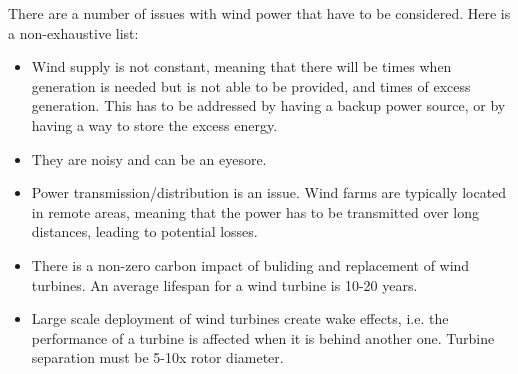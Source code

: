 There are a number of issues with wind power that have to be considered. Here is
a non-exhaustive list:
\begin{itemize}
    \item Wind supply is not constant, meaning that there will be times when generation
    is needed but is not able to be provided, and times of excess generation. This
    has to be addressed by having a backup power source, or by having a way to store
    the excess energy.
    \item They are noisy and can be an eyesore. 
    \item Power transmission/distribution is an issue. Wind farms are typically
    located in remote areas, meaning that the power has to be transmitted over long
    distances, leading to potential losses.
    \item There is a non-zero carbon impact of buliding and replacement of wind
    turbines. An average lifespan for a wind turbine is 10-20 years.
    \item Large scale deployment of wind turbines create wake effects, i.e. the
    performance of a turbine is affected when it is behind another one. Turbine 
    separation must be 5-10x rotor diameter.
\end{itemize}



